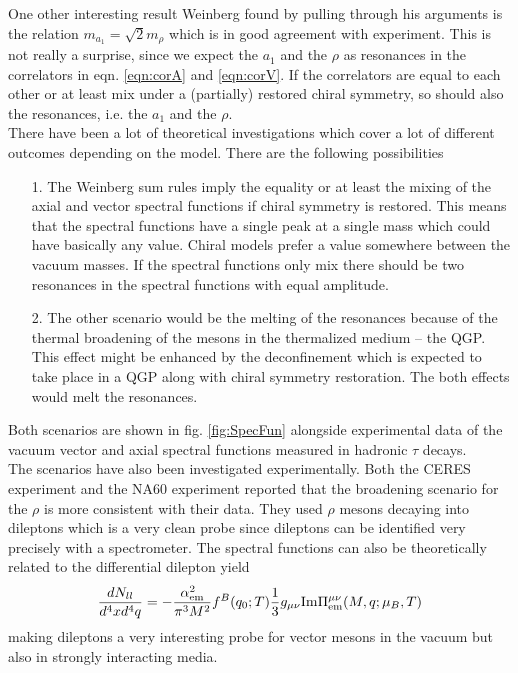 One other interesting result Weinberg \cite{WeinbergAVmixing} found by pulling through his arguments is the relation $m_{a_1} = \sqrt{2}m_{\rho}$ which is in good agreement with experiment. This is not really a surprise, since we expect the $a_1$ and the $\rho$ as resonances in the correlators in eqn. \ref{eqn:corA} and \ref{eqn:corV}. If the correlators are equal to each other or at least mix under a (partially) restored chiral symmetry, so should also the resonances, i.e. the $a_1$ and the $\rho$. \\
There have been a lot of theoretical investigations which cover a lot of different outcomes depending on the model. There are the following possibilities \cite{ChiSym}
\begin{itemize}
\item[1.] The Weinberg sum rules imply the equality or at least the mixing of the axial and vector spectral functions if chiral symmetry is restored. This means that the spectral functions have a single peak at a single mass which could have basically any value. Chiral models prefer a value somewhere between the vacuum masses. If the spectral functions only mix there should be two resonances in the spectral functions with equal amplitude.
\item[2.] The other scenario would be the melting of the resonances because of the thermal broadening of the mesons in the thermalized medium -- the QGP. This effect might be enhanced by the deconfinement which is expected to take place in a QGP along with chiral symmetry restoration. The both effects would melt the resonances.
\end{itemize}
Both scenarios are shown in fig. \ref{fig:SpecFun} alongside experimental data of the vacuum vector and axial spectral functions measured in hadronic $\tau$ decays. \\
The scenarios have also been investigated experimentally. Both the CERES experiment \cite{CERESrho} and the NA60 experiment \cite{NA60rho} reported that the broadening scenario for the $\rho$ is more consistent with their data. They used $\rho$ mesons decaying into dileptons which is a very clean probe since dileptons can be identified very precisely with a spectrometer. The spectral functions can also be theoretically related to the differential dilepton yield \cite{RappChiRes}
\begin{equation}
\frac{dN_{ll}}{d^4xd^4q} = -\frac{\alpha_{\mathrm{em}}^2}{\pi^3M^2} f^B(q_0;T)\frac{1}{3} g_{\mu\nu} \mathrm{Im} \Pi^{\mu\nu}_{\mathrm{em}}(M,q;\mu_B,T)
\end{equation}
making dileptons a very interesting probe for vector mesons in the vacuum but also in strongly interacting media. 



